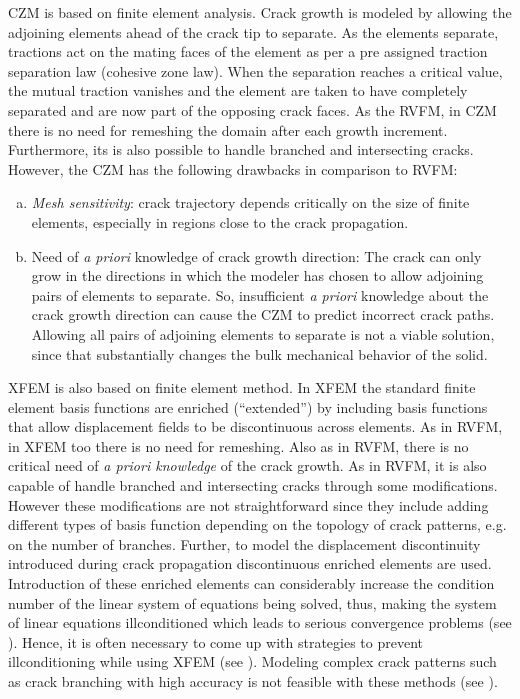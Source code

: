 \documentclass[11pt] {article}
\begin{document}
CZM is based on finite element analysis. Crack growth is modeled by allowing the adjoining elements ahead of the crack tip to separate. As the elements separate, tractions act on the mating faces of the element as per a pre assigned traction separation law (cohesive zone law). When the separation reaches a critical value, the mutual traction vanishes and the element are taken to have completely separated and are now part of the opposing crack faces. As the RVFM, in CZM there is no need for remeshing the domain after each growth increment. Furthermore, its is also possible to handle branched and intersecting cracks. However, the CZM has the following drawbacks in
comparison to RVFM:
\begin{enumerate}[a.]
	\item \textit{Mesh sensitivity}: crack trajectory depends critically on the size of finite elements, especially in regions close to the crack propagation.
	\item Need of \textit{a priori} knowledge of crack growth direction: The crack can only grow in the directions in which the modeler has chosen to allow adjoining pairs of elements to separate. So, insufficient \textit{a priori} knowledge about the crack growth direction can cause the CZM to predict incorrect crack paths. Allowing all pairs of adjoining elements to separate is not a viable solution, since that substantially changes the bulk mechanical behavior of the solid.
\end{enumerate}
XFEM is also based on finite element method. In XFEM the standard finite element basis functions are enriched (“extended”) by including basis functions that allow displacement fields to be discontinuous across elements. As in RVFM, in XFEM too there is no need for remeshing. Also as in RVFM, there is no critical need of \textit{a priori knowledge} of the crack growth. As in RVFM, it is also capable of handle branched and intersecting cracks through some
modifications. However these modifications are not straightforward since they include adding different types of basis function depending on the topology of crack patterns, e.g. on the
number of branches. Further, to model the displacement discontinuity introduced during crack propagation discontinuous enriched elements are used. Introduction of these enriched elements can considerably increase the condition number of the linear system of equations being solved, thus, making the system of linear equations illconditioned
which leads to serious convergence problems (see \cite{lasry_2010}). Hence, it is often necessary to come up with strategies to prevent illconditioning while using XFEM (see \cite{xiao_2007l,zhao_2014}). Modeling complex crack patterns such as crack branching with high accuracy is not feasible with these methods (see \cite{song_2008}).
\end{document}
